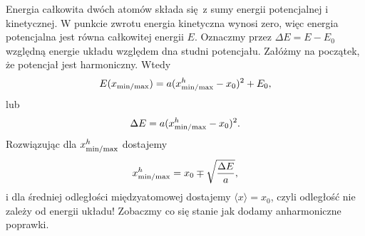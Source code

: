 \documentclass[11pt,a4paper]{article}
\begin{document}
Energia całkowita dwóch atomów składa się z sumy energii potencjalnej i kinetycznej. W punkcie zwrotu energia kinetyczna wynosi zero, więc energia potencjalna jest równa całkowitej energii $E$. Oznaczmy przez $\Delta E = E - E_0$ względną energie układu względem dna studni potencjału. Załóżmy na początek, że potencjał jest harmoniczny. Wtedy
\begin{equation}
	E(x_{\rm min/max}) = a ( x_{\rm min/max}^h - x_0)^2 + E_0,
\end{equation}
lub
\begin{equation}
	\Delta E = a (x_{\rm min/max}^h - x_0)^2.
\end{equation}
Rozwiązując dla $x_{\rm min/max}^h$ dostajemy
\begin{equation}
	x_{\rm min/max}^h = x_0 \mp \sqrt{\frac{\Delta E}{a}},
\end{equation}
i dla średniej odległości międzyatomowej dostajemy $\langle x \rangle = x_0$, czyli odległość nie zależy od energii układu! Zobaczmy co się stanie jak dodamy anharmoniczne poprawki.
\end{document}
